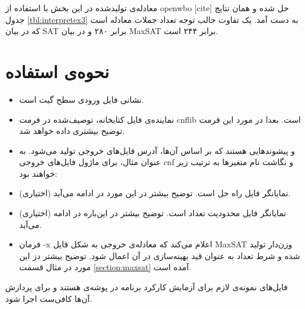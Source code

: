 \documentclass{article}
\begin{document}
معادله‌ی تولیدشده در این بخش با استفاده از {openwbo} {[cite]} حل شده و همان نتایج جدول \ref{tbl:interpretex3} به دست آمد. یک تفاوت جالب توجه تعداد جملات معادله است که در بیان SAT برابر ۲۸۰ و در بیان MaxSAT برابر ۲۴۴ است. 

\section{نحوه‌ی استفاده}\label{usage}

\begin{flushleft}
\end{flushleft}

\begin{itemize}
\item {} نشانی فایل ورودی سطح گیت است. 

\item {} نماینده‌ی فایل کتابخانه، توصیف‌شده در فرمت cnflib است. بعدا در مورد این فرمت توضیح بیشتری داده خواهد شد. 

\item {} و  پیشوندهایی هستند که بر اساس آن‌ها، آدرس فایل‌های خروجی تولید می‌شود. به عنوان مثال، 
برای ماژول  فایل‌های خروجی cnf و نگاشت نام متغیرها به ترتیب زیر خواهند بود: 



\item {} (اختیاری) نمایانگر فایل راه حل است. توضیح بیشتر در این مورد در ادامه می‌آید. 

\item {} (اختیاری) نمایانگر فایل محدودیت تعداد است. توضیح بیشتر در این‌باره در ادامه می‌آید. 

\item فرمان -x 
اعلام می‌کند که معادله‌ی خروجی به شکل فایل MaxSAT وزن‌دار تولید شده و شرط تعداد به عنوان قید بهینه‌سازی در آن اعمال شود. توضیح بیشتر دز این مورد در مثال قسمت \ref{section:maxsat} آمده است.

\end{itemize}
فایل‌های نمونه‌ی لازم برای آزمایش کارکرد برنامه در پوشه‌ی  هستند و برای پردازش‌ آن‌ها کافی‌ست  اجرا شود. 
\end{document}
